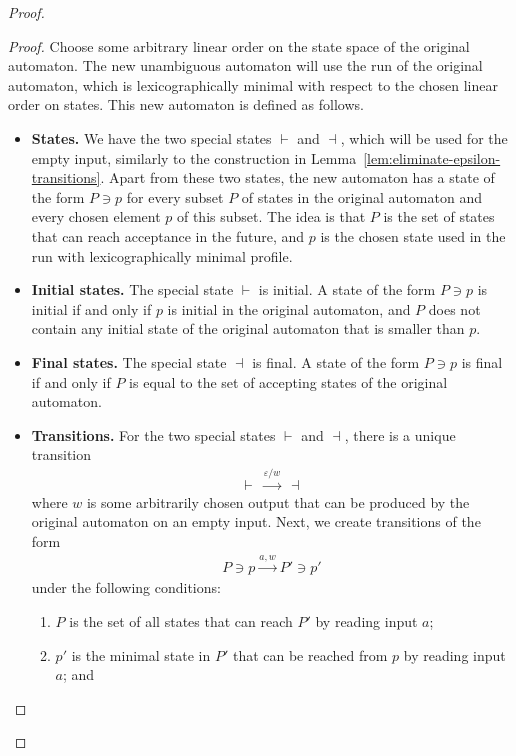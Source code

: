 \begin{proof}
\begin{proof}
        Choose some arbitrary linear order on the state space of the original automaton. The new unambiguous automaton will use the run of the original automaton, which is lexicographically minimal with respect to the chosen linear order on states. This new automaton is defined as follows.  
        \begin{itemize}
            \item \textbf{States.} We have the two special states $\vdash$ and $\dashv$, which will be used for the empty input, similarly to the construction in Lemma~\ref{lem:eliminate-epsilon-transitions}. Apart from these two states, the new automaton has a state  of the form    $P \ni p$ for every subset  $P$ of states in the original automaton and every chosen element $p$ of this subset.  The  idea is that $P$ is the set of states that can reach acceptance in the future, and $p$ is the chosen state used in the run with lexicographically minimal profile.
            \item \textbf{Initial states.} The special state $\vdash$ is initial.  A state  of the form  $P \ni p$ is initial  if and only if  $p$ is initial in the original automaton, and $P$ does not contain any initial state of the original automaton that is smaller than $p$.
            \item \textbf{Final states.} The special state $\dashv$ is final.  A state of the form $P \ni p$ is final  if and only if  $P$ is equal to the set of accepting states of the original automaton.
            \item \textbf{Transitions.} For the two special states $\vdash$ and $\dashv$, there is a unique transition 
            \begin{align*}
            \vdash \ \xrightarrow{ \varepsilon / w} \ \dashv
            \end{align*}
            where $w$ is some arbitrarily chosen output that can be produced by the original automaton on an empty input. Next, we create transitions of the form 
        \begin{align*}
        P \ni p
        \xrightarrow {a,w}
        P' \ni p'
        \end{align*}
        under the following conditions:
        \begin{enumerate}
            \item $P$ is the set of all states that can reach $P'$ by reading input $a$;
            \item $p'$ is the minimal state in $P'$ that can be reached from $p$ by reading input $a$; and

\end{enumerate}
\end{itemize}
\end{proof}
\end{proof}
